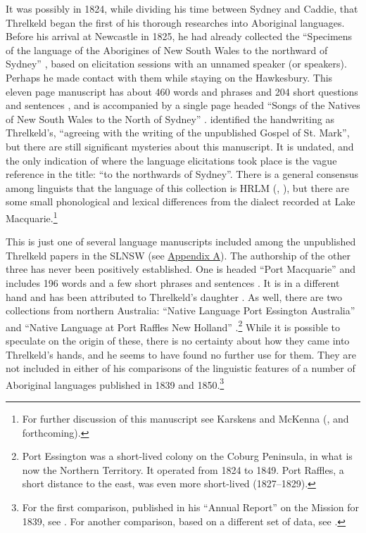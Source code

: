 It was possibly in 1824, while dividing his time between Sydney and Caddie, that Threlkeld began the first of his thorough researches into Aboriginal languages. Before his arrival at Newcastle in 1825, he had already collected the “Speci\-mens of the language of the Aborigines of New South Wales to the northward of Sydney” \citep{threlkeld_specimens_1824}, based on elicitation sessions with an unnamed speaker (or speakers). Perhaps he made contact with them while staying on the Hawkesbury. This eleven page manuscript has about 460 words and phrases and 204 short questions and sentences \citep[104--106]{threlkeld_threlkeld_1822-1862}, and is accompanied by a single page headed “Songs of the Natives of New South Wales to the North of Sydney” \citep[107]{threlkeld_threlkeld_1822-1862}. \citet[23]{capell_aboriginal_1970} identified the handwriting as Threlkeld’s, “agreeing with the writing of the unpublished Gospel of St. Mark”, but there are still significant mysteries about this manuscript. It is undated, and the only indication of where the language elicitations took place is the vague reference in the title: “to the northwards of Sydney”. There is a general consensus among linguists that the language of this collection is HRLM (\cite[168--174]{wafer_handbook_2008}, \cite{lambert_colonial_2006}), but there are some small phonological and lexical differences from the dialect recorded at Lake Macquarie.\footnote{For further discussion of this manuscript see Karskens and McKenna (\citeyear[102]{karskens_nah_2019}, and forthcoming).}

This is just one of several language manuscripts included among the unpublished Threlkeld papers in the SLNSW (see \hyperref[Appendix_A]{Appendix A}). The authorship of the other three has never been positively established. One is headed “Port Macquarie” and includes 196 words and a few short phrases and sentences \citep[104--106]{threlkeld_threlkeld_1822-1862}. It is in a different hand and has been attributed to Threlkeld’s daughter \citep[23]{capell_aboriginal_1970}. As well, there are two collections from northern Australia: “Native Language Port Essington Australia” \citep[119--120]{threlkeld_threlkeld_1822-1862} and “Native Language at Port Raffles New Holland” \citep[121--122]{threlkeld_threlkeld_1822-1862}.\footnote{Port Essington was a short-lived colony on the Coburg Peninsula, in what is now the Northern Territory. It operated from 1824 to 1849. Port Raffles, a short distance to the east, was even more short-lived (1827--1829).} While it is possible to speculate on the origin of these, there is no certainty about how they came into Threlkeld’s hands, and he seems to have found no further use for them. They are not included in either of his comparisons of the linguistic features of a number of Aboriginal languages published in 1839 and 1850.\footnote{For the first comparison, published in his “Annual Report” on the Mission for 1839, see \citet[161]{gunson_australian_1974a}. For another comparison, based on a different set of data, see \citet[70--71]{threlkeld_key_1850}.}

